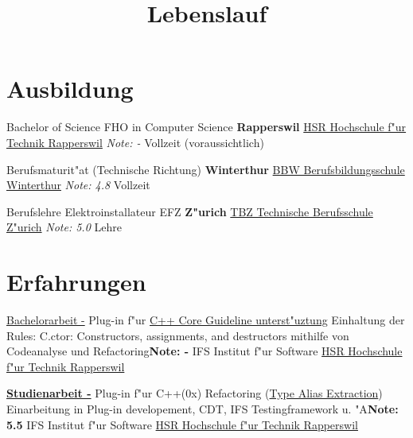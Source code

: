 \documentclass[11pt,legalpaper,sans]{moderncv}
\title{Lebenslauf}
\begin{document}
\makecvtitle

\section{Ausbildung}
{Bachelor of Science FHO in Computer Science}
{\hfill\bfseries Rapperswil}
{\newline{}\href{http://www.hsr.ch/}{HSR Hochschule f"ur Technik Rapperswil}}
{\hfill\textit{Note: -}}
{Vollzeit (voraussichtlich)}

{Berufsmaturit"at (Technische Richtung)}
{\hfill\bfseries Winterthur}
{\newline{}\href{http://www.bbw.ch/}{BBW Berufsbildungsschule Winterthur}}
{\hfill\textit{Note: 4.8}}
{Vollzeit}

{Berufslehre Elektroinstallateur EFZ}
{\hfill\bfseries Z"urich}
{\newline{}\href{htttp://www.tbz.ch/}{TBZ Technische Berufsschule Z"urich}}
{\hfill\textit{Note: 5.0}}
{Lehre}

\section{Erfahrungen}
{\href{http://sinv-56012.edu.hsr.ch/ccglator}{Bachelorarbeit -} Plug-in f"ur \href{https://github.com/isocpp/CppCoreGuidelines/blob/master/CppCoreGuidelines.md}{C++ Core Guideline unterst"uztung}}{}
{\newline{}Einhaltung der Rules: C.ctor: Constructors, assignments, and destructors mithilfe von Codeanalyse und Refactoring}{\hfill \textbf{Note: -}}
{IFS Institut f"ur Software \hfill\href{http://www.hsr.ch/}{HSR Hochschule f"ur Technik Rapperswil}}

{\href{http://sinv-56012.edu.hsr.ch/aliextor}{\textbf{Studienarbeit -}} Plug-in f"ur C++(0x) Refactoring (\href{http://sinv-56012.edu.hsr.ch/video.mp4}{Type Alias Extraction})}{}
{\newline{}Einarbeitung in Plug-in developement, CDT, IFS Testingframework u. "A}{\hfill \textbf{Note: 5.5}}
{IFS Institut f"ur Software \hfill\href{http://www.hsr.ch/}{HSR Hochschule f"ur Technik Rapperswil}}
\end{document}

